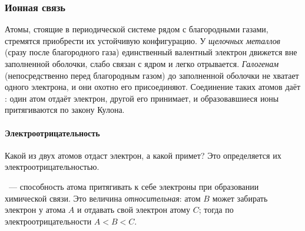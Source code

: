 \newcommand{\RRcell}[4]{%
    \begin{scope}[shift={(#1,0)}]
      \foreach \sx in {-1,1}{\foreach \sy in {-1,1}{
        \draw[atomLine, fill=atomA, line width=0.5pt] (\sx*#2,\sy*#2) circle (1);}}
      \draw[atomLine, fill=atomB, line width=0.5pt] (0,0) circle (#3);
      \node[font=\small, align=center, anchor=north] at (0,-2.45) {#4};
    \end{scope}}
\newcommand{\vdwDip}[3][1]{%
    \begin{scope}[shift={#2}, rotate=#3, scale=#1]
      \begin{scope}\clip (0,0) ellipse (0.62 and 0.3);
        \fill[fmBlue!25] (-0.7,-0.4) rectangle (0,0.4);
        \fill[fmRed!25] (0,-0.4) rectangle (0.7,0.4);
      \end{scope}
      \draw[atomLine, line width=0.5pt] (0,0) ellipse (0.62 and 0.3);
      \node[font=\scriptsize] at (-0.33,0) {$-$}; \node[font=\scriptsize] at (0.33,0) {$+$};
    \end{scope}}

\subsubsection{Ионная связь}\label{sssec:ionic}

Атомы, стоящие в периодической системе рядом с благородными газами,
стремятся приобрести их устойчивую конфигурацию. У \emph{щелочных
металлов} (сразу после благородного газа) единственный валентный
электрон движется вне заполненной оболочки, слабо связан с ядром и легко
отрывается. \emph{Галогенам} (непосредственно перед благородным газом)
до заполненной оболочки не хватает одного электрона, и они охотно его
присоединяют. Соединение таких атомов даёт : один атом
отдаёт электрон, другой его принимает, и образовавшиеся ионы
притягиваются по закону Кулона.

\paragraph{Электроотрицательность}
Какой из двух атомов отдаст электрон, а какой примет? Это определяется их
электроотрицательностью.
\begin{opredelenie}
~— способность атома притягивать к себе
электроны при образовании химической связи. Это величина
\emph{относительная}: атом $B$ может забирать электрон у атома $A$ и
отдавать свой электрон атому $C$; тогда по электроотрицательности
$A<B<C$.
\end{opredelenie}

